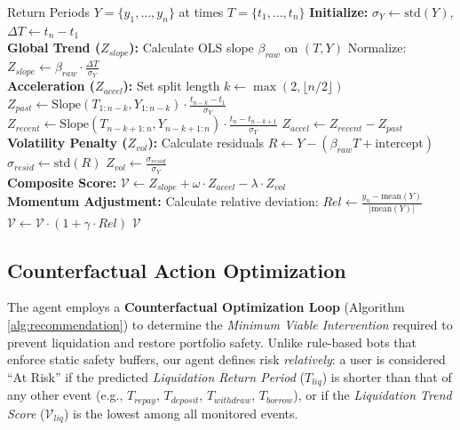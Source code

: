 \documentclass[manuscript,screen,review]{acmart}
\begin{document}
\begin{algorithm}[tbh]
\caption{Dimensionless Trend-Risk Scoring}
\label{alg:trend_slope}
\begin{algorithmic}[1]
\REQUIRE Return Periods $Y = \{y_1, \dots, y_n\}$ at times $T = \{t_1, \dots, t_n\}$
\STATE \textbf{Initialize:} $\sigma_Y \leftarrow \text{std}(Y)$, $\Delta T \leftarrow t_n - t_1$
\\ \textbf{Global Trend ($Z_{slope}$):}
\STATE Calculate OLS slope $\beta_{raw}$ on $(T, Y)$
\STATE Normalize: $Z_{slope} \leftarrow \beta_{raw} \cdot \frac{\Delta T}{\sigma_Y}$
\\ \textbf{Acceleration ($Z_{accel}$):}
\STATE Set split length $k \leftarrow \max(2, \lfloor n/2 \rfloor)$
\STATE $Z_{past} \leftarrow \text{Slope}(T_{1:n-k}, Y_{1:n-k}) \cdot \frac{t_{n-k}-t_1}{\sigma_Y}$
\STATE $Z_{recent} \leftarrow \text{Slope}(T_{n-k+1:n}, Y_{n-k+1:n}) \cdot \frac{t_n - t_{n-k+1}}{\sigma_Y}$
\STATE $Z_{accel} \leftarrow Z_{recent} - Z_{past}$
\\ \textbf{Volatility Penalty ($Z_{vol}$):}
\STATE Calculate residuals $R \leftarrow Y - (\beta_{raw}T + \text{intercept})$
\STATE $\sigma_{resid} \leftarrow \text{std}(R)$
\STATE $Z_{vol} \leftarrow \frac{\sigma_{resid}}{\sigma_Y}$
\\ \textbf{Composite Score:}
\STATE $\mathcal{V} \leftarrow Z_{slope} + \omega \cdot Z_{accel} - \lambda \cdot Z_{vol}$
\\ \textbf{Momentum Adjustment:}
\STATE Calculate relative deviation: $Rel \leftarrow \frac{y_n - \text{mean}(Y)}{|\text{mean}(Y)|}$
\STATE $\mathcal{V} \leftarrow \mathcal{V} \cdot (1 + \gamma \cdot Rel)$
\RETURN $\mathcal{V}$
\end{algorithmic}
\end{algorithm}

\subsection{Counterfactual Action Optimization}
The agent employs a \textbf{Counterfactual Optimization Loop} (Algorithm \ref{alg:recommendation}) to determine the \textit{Minimum Viable Intervention} required to prevent liquidation and restore portfolio safety. Unlike rule-based bots that enforce static safety buffers, our agent defines risk \textit{relatively}: a user is considered ``At Risk'' if the predicted \emph{Liquidation Return Period} ($T_{liq}$) is shorter than that of any other event (e.g., $T_{repay}$, $T_{deposit}$, $T_{withdraw}$, $T_{borrow}$), or if the \emph{Liquidation Trend Score} ($\mathcal{V}_{liq}$) is the lowest among all monitored events.
\end{document}

